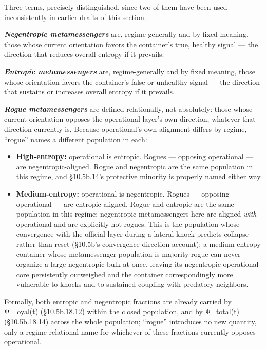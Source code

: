 \documentclass[
]{article}
\begin{document}
Three terms, precisely distinguished, since two of them have been used
inconsistently in earlier drafts of this section.

\emph{\textbf{Negentropic metamessengers}} are, regime-generally and by
fixed meaning, those whose current orientation favors the container's
true, healthy signal --- the direction that reduces overall entropy if
it prevails.

\emph{\textbf{Entropic metamessengers}} are, regime-generally and by
fixed meaning, those whose orientation favors the container's false or
unhealthy signal --- the direction that sustains or increases overall
entropy if it prevails.

\emph{\textbf{Rogue metamessengers}} are defined relationally, not
absolutely: those whose current orientation opposes the operational
layer's own direction, whatever that direction currently is. Because
operational's own alignment differs by regime, ``rogue'' names a
different population in each:

\begin{itemize}
\item
  \textbf{High-entropy:} operational is entropic. Rogues --- opposing
  operational --- are negentropic-aligned. Rogue and negentropic are the
  same population in this regime, and §10.5b.14's protective minority is
  properly named either way.
\item
  \textbf{Medium-entropy:} operational is negentropic. Rogues ---
  opposing operational --- are entropic-aligned. Rogue and entropic are
  the same population in this regime; negentropic metamessengers here
  are aligned \emph{with} operational and are explicitly not rogues.
  This is the population whose convergence with the official layer
  during a lateral knock predicts collapse rather than reset (§10.5b's
  convergence-direction account); a medium-entropy container whose
  metamessenger population is majority-rogue can never organize a large
  negentropic bulk at once, leaving its negentropic operational core
  persistently outweighed and the container correspondingly more
  vulnerable to knocks and to sustained coupling with predatory
  neighbors.
\end{itemize}

Formally, both entropic and negentropic fractions are already carried by
Ψ\_loyal(t) (§10.5b.18.12) within the closed population, and by
Ψ\_total(t) (§10.5b.18.14) across the whole population; ``rogue''
introduces no new quantity, only a regime-relational name for whichever
of these fractions currently opposes operational.
\end{document}
